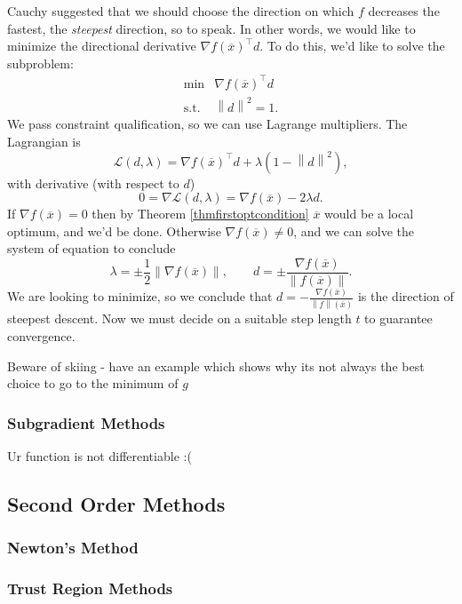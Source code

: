 \documentclass{article}
\numberwithin{equation}{section}
\theoremstyle{definition}
\newcommand{\cL}{\mathcal{L}}
\newcommand{\norm}[1]{\left\lVert#1\right\rVert}
\newcommand{\ox}{\overline{x}}
\begin{document}
Cauchy suggested that we should choose the direction on which $f$ decreases the fastest, the \textit{steepest} direction, so to speak. In other words, we would like to minimize the directional derivative $\nabla f(\ox)^\top d$. To do this, we'd like to solve the subproblem:
\begin{equation}
    \begin{array}{cc}
         \min & \nabla f(\ox)^\top d \\
         \mathrm{s.t.} & \norm d^2=1.
    \end{array}
\end{equation}
We pass constraint qualification, so we can use Lagrange multipliers. The Lagrangian is
\begin{equation}
    \cL(d,\lambda)=\nabla f(\ox)^\top d+\lambda(1-\norm d^2),
\end{equation}
with derivative (with respect to $d$)
\begin{equation}
    0=\nabla\cL(d,\lambda)=\nabla f(\ox) - 2\lambda d.
\end{equation}
If $\nabla f(\ox)=0$ then by Theorem \ref{thmfirstoptcondition} $\ox$ would be a local optimum, and we'd be done. Otherwise $\nabla f(\ox)\neq 0$, and we can solve the system of equation to conclude
\begin{equation}
    \lambda=\pm\frac12\norm{\nabla f(\ox)},\qquad d=\pm\frac{\nabla f(\ox)}{\norm {f(\ox)}}.
\end{equation}
We are looking to minimize, so we conclude that $d=-\frac{\nabla f(\ox)}{\norm f(\ox)}$ is the direction of steepest descent. Now we must decide on a suitable step length $t$ to guarantee convergence.

Beware of skiing - have an example which shows why its not always the best choice to go to the minimum of $g$
\subsubsection{Subgradient Methods}
Ur function is not differentiable :(
\subsection{Second Order Methods}
\subsubsection{Newton's Method}
\subsubsection{Trust Region Methods}
\end{document}
